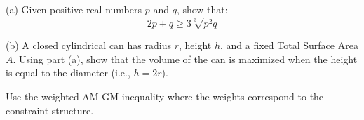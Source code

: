 

\begin{problem}
(a) Given positive real numbers $p$ and $q$, show that:
\[ 2p + q \ge 3 \sqrt[3]{p^2 q} \]

(b) A closed cylindrical can has radius $r$, height $h$, and a fixed Total Surface Area $A$.
Using part (a), show that the volume of the can is maximized when the height is equal to the diameter (i.e., $h = 2r$).

\vspace{1cm}

\begin{center}
\end{center}
\end{problem}

\begin{hint}
Use the weighted AM-GM inequality where the weights correspond to the constraint structure.
\end{hint}

